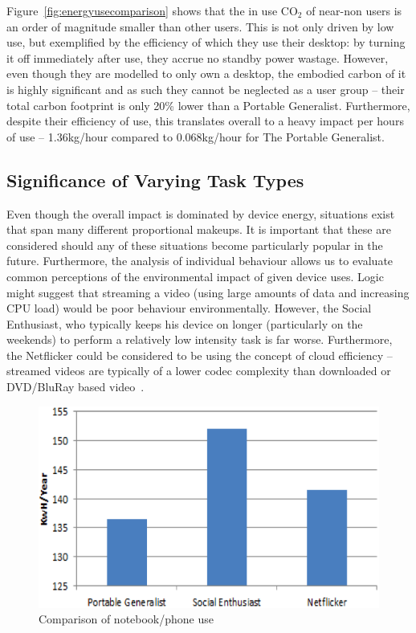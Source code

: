 \documentclass[conference]{IEEEtran}
\begin{document}
Figure~\ref{fig:energyusecomparison} shows that the in use CO$_2$ of
near-non users is an order of magnitude smaller than other users. This
is not only driven by low use, but exemplified by the efficiency of
which they use their desktop: by turning it off immediately after use,
they accrue no standby power wastage. However, even though they are
modelled to only own a desktop, the embodied carbon of it is highly
significant and as such they cannot be neglected as a user group --
their total carbon footprint is only 20\% lower than a Portable
Generalist. Furthermore, despite their efficiency of use, this
translates overall to a heavy impact per hours of use -- 1.36kg/hour
compared to 0.068kg/hour for The Portable Generalist.

\subsection{Significance of Varying Task Types}

Even though the overall impact is dominated by device energy,
situations exist that span many different proportional makeups. It is
important that these are considered should any of these situations
become particularly popular in the future. Furthermore, the analysis
of individual behaviour allows us to evaluate common perceptions of
the environmental impact of given device uses. Logic might suggest
that streaming a video (using large amounts of data and increasing CPU
load) would be poor behaviour environmentally. However, the Social
Enthusiast, who typically keeps his device on longer (particularly on
the weekends) to perform a relatively low intensity task is far
worse. Furthermore, the Netflicker could be considered to be using the
concept of cloud efficiency -- streamed videos are typically of a
lower codec complexity than downloaded or DVD/BluRay based
video~\cite{schien-et-al:2013}.

\begin{figure}
\centering
\includegraphics[width=0.9\columnwidth]{images/comparison_users_devices.png}
\caption{Comparison of notebook/phone use}
\label{fig:comparison_users_devices.png} 
\end{figure}
\end{document}
